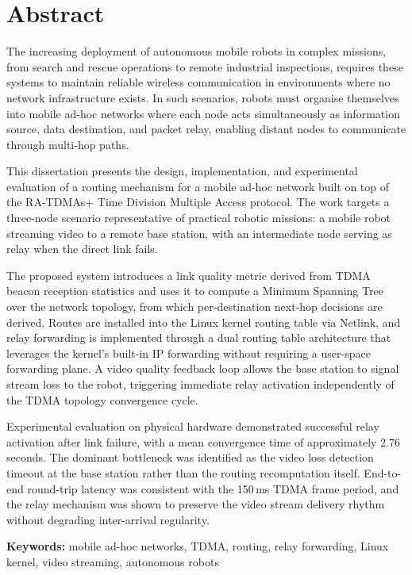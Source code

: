 
\chapter*{Abstract}

The increasing deployment of autonomous mobile robots in complex missions,
from search and rescue operations to remote industrial inspections, requires
these systems to maintain reliable wireless communication in environments where
no network infrastructure exists. In such scenarios, robots must organise
themselves into mobile ad-hoc networks where each node acts simultaneously as
information source, data destination, and packet relay, enabling distant nodes
to communicate through multi-hop paths.

This dissertation presents the design, implementation, and experimental
evaluation of a routing mechanism for a mobile ad-hoc network built on top of
the RA-TDMAs+ Time Division Multiple Access protocol. The work targets a
three-node scenario representative of practical robotic missions: a mobile
robot streaming video to a remote base station, with an intermediate node
serving as relay when the direct link fails.

The proposed system introduces a link quality metric derived from TDMA beacon
reception statistics and uses it to compute a Minimum Spanning Tree over the
network topology, from which per-destination next-hop decisions are derived.
Routes are installed into the Linux kernel routing table via Netlink, and relay
forwarding is implemented through a dual routing table architecture that
leverages the kernel's built-in IP forwarding without requiring a user-space
forwarding plane. A video quality feedback loop allows the base station to
signal stream loss to the robot, triggering immediate relay activation
independently of the TDMA topology convergence cycle.

Experimental evaluation on physical hardware demonstrated successful relay
activation after link failure, with a mean convergence time of approximately
2.76 seconds. The dominant bottleneck was identified as the video loss
detection timeout at the base station rather than the routing recomputation
itself. End-to-end round-trip latency was consistent with the 150\,ms TDMA
frame period, and the relay mechanism was shown to preserve the video stream
delivery rhythm without degrading inter-arrival regularity.

\vspace{1em}
\noindent\textbf{Keywords:} mobile ad-hoc networks, TDMA, routing, relay
forwarding, Linux kernel, video streaming, autonomous robots
